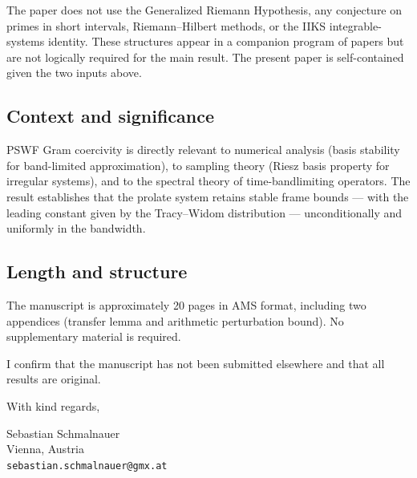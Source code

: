 \documentclass[12pt,a4paper]{article}
\begin{document}
The paper does not use the Generalized Riemann Hypothesis,
any conjecture on primes in short intervals, Riemann--Hilbert methods,
or the IIKS integrable-systems identity.
These structures appear in a companion program of papers
but are not logically required for the main result.
The present paper is self-contained given the two inputs above.

\subsection*{Context and significance}

PSWF Gram coercivity is directly relevant to numerical analysis
(basis stability for band-limited approximation), to sampling theory
(Riesz basis property for irregular systems), and to the spectral
theory of time-bandlimiting operators.
The result establishes that the prolate system retains stable frame
bounds --- with the leading constant given by the Tracy--Widom
distribution --- unconditionally and uniformly in the bandwidth.

\subsection*{Length and structure}

The manuscript is approximately 20 pages in AMS format,
including two appendices (transfer lemma and arithmetic perturbation bound).
No supplementary material is required.

\bigskip

\noindent
I confirm that the manuscript has not been submitted elsewhere
and that all results are original.

\bigskip

\noindent
With kind regards,

\bigskip

\noindent
Sebastian Schmalnauer\\
Vienna, Austria\\
\texttt{sebastian.schmalnauer@gmx.at}
\end{document}
